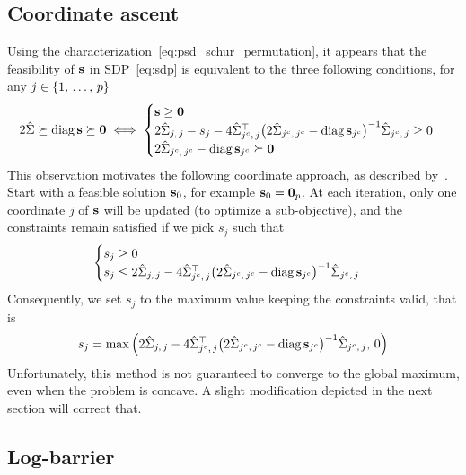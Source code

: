 \subsection{Coordinate ascent}\label{subsec:coordinate_ascent}

Using the characterization~\ref{eq:psd_schur_permutation},
it appears that the feasibility of $\mathbf{s}$ in SDP~\ref{eq:sdp} is equivalent to the three following conditions,
for any $j \in \left\{ 1,\, \dots,\, p \right\}$
\begin{equation}\label{eq:schur_sdp_constraints}
    2\hat{\Sigma} \succeq \operatorname*{diag} \mathbf{s} \succeq \mathbf{0}
    \iff
    \begin{cases}
        \mathbf{s} \geq \mathbf{0}\\
        2\hat{\Sigma}_{j,\, j} - s_j
            - 4\hat{\Sigma}_{j^c,\, j}^\top\big( 2\hat{\Sigma}_{j^c,\, j^c} - \operatorname*{diag} \mathbf{s}_{j^c} \big)^{-1}\hat{\Sigma}_{j^c,\, j} \geq 0\\
        2\hat{\Sigma}_{j^c,\, j^c} - \operatorname*{diag} \mathbf{s}_{j^c} \succeq \mathbf{0}
    \end{cases}
\end{equation}
This observation motivates the following coordinate approach, as described by~\cite{block_coordinate_sdp}.
Start with a feasible solution $\mathbf{s}_0$, for example $\mathbf{s}_0 = \mathbf{0}_p$.
At each iteration, only one coordinate $j$ of $\mathbf{s}$ will be updated (to optimize a sub-objective),
and the constraints remain satisfied if we pick $s_j$ such that
\begin{equation}\label{eq:sdp_simple_constraints}
    \begin{cases}
        s_j \geq 0\\
        s_j \leq 2\hat{\Sigma}_{j,\, j}
            - 4\hat{\Sigma}_{j^c,\, j}^\top\big( 2\hat{\Sigma}_{j^c,\, j^c} - \operatorname*{diag} \mathbf{s}_{j^c} \big)^{-1}\hat{\Sigma}_{j^c,\, j}
    \end{cases}
\end{equation}
Consequently, we set $s_j$ to the maximum value keeping the constraints valid,
that is
\begin{equation*}
s_j = \max\Big( 2\hat{\Sigma}_{j,\, j}
    - 4\hat{\Sigma}_{j^c,\, j}^\top\big( 2\hat{\Sigma}_{j^c,\, j^c} - \operatorname*{diag} \mathbf{s}_{j^c} \big)^{-1}\hat{\Sigma}_{j^c,\, j}
    ,\, 0 \Big)
\end{equation*}
Unfortunately, this method is not guaranteed to converge to the global maximum, even when the problem is concave.
A slight modification depicted in the next section will correct that.

\subsection{Log-barrier}\label{subsec:log_barrier}


